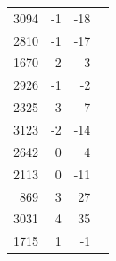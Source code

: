 \documentclass{exam}
\begin{document}
\begin{table}[H]
\begin{tabular}{rrrr}
      3094 & -1                    & -18 \\
      2810 & -1                    & -17 \\
      1670 & 2                     & 3 \\
      2926 & -1                    & -2 \\
      2325 & 3                     & 7 \\
      3123 & -2                    & -14 \\
      2642 & 0                     & 4 \\
      2113 & 0                     & -11 \\
      869  & 3                     & 27 \\
      3031 & 4                     & 35 \\
      1715 & 1                     & -1 \\
      \bottomrule
    \end{tabular}
  \end{table}
\end{document}
